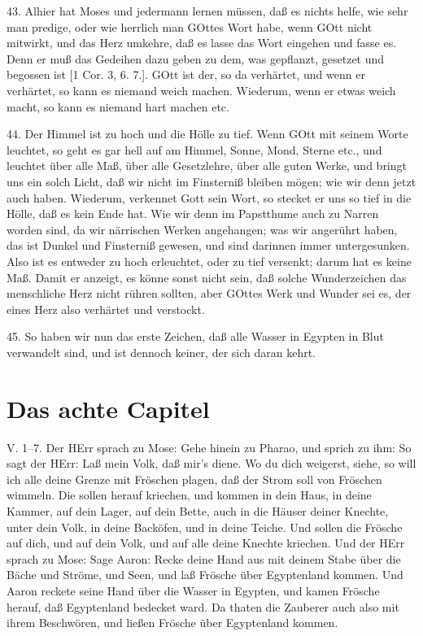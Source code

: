 43. Alhier hat Moses und jedermann lernen müssen, daß es nichts helfe, wie sehr man predige, oder wie herrlich man GOttes Wort habe, wenn GOtt nicht mitwirkt, und das Herz umkehre, daß es lasse das Wort eingehen und fasse es. Denn er muß das Gedeihen dazu geben zu dem, was gepflanzt, gesetzet und begossen ist [1 Cor. 3, 6. 7.]. GOtt ist der, so da verhärtet, und wenn er verhärtet, so kann es niemand weich machen. Wiederum, wenn er etwas weich macht, so kann es niemand hart machen etc.

44. Der Himmel ist zu hoch und die Hölle zu tief. Wenn GOtt mit seinem Worte leuchtet, so geht es gar hell auf am Himmel, Sonne, Mond, Sterne etc., und leuchtet über alle Maß, über alle Gesetzlehre, über alle guten Werke, und bringt uns ein solch Licht, daß wir nicht im Finsterniß bleiben mögen; wie wir denn jetzt auch haben. Wiederum, verkennet Gott sein Wort, so stecket er uns so tief in die Hölle, daß es kein Ende hat. Wie wir denn im Papstthume auch zu Narren worden sind, da wir närrischen Werken angehangen; was wir angerührt haben, das ist Dunkel und Finsterniß gewesen, und sind darinnen immer untergesunken. Also ist es entweder zu hoch erleuchtet, oder zu tief versenkt; darum hat es keine Maß. Damit er anzeigt, es könne sonst nicht sein, daß solche Wunderzeichen das menschliche Herz nicht rühren sollten, aber GOttes Werk und Wunder sei es, der eines Herz also verhärtet und verstockt.

45. So haben wir nun das erste Zeichen, daß alle Wasser in Egypten in Blut verwandelt sind, und ist dennoch keiner, der sich daran kehrt.

\section{Das achte Capitel}

\begin{schriftzitat}
V. 1–7. Der HErr sprach zu Mose: Gehe hinein zu Pharao, und sprich zu ihm: So sagt der HErr: Laß mein Volk, daß mir’s diene. Wo du dich weigerst, siehe, so will ich alle deine Grenze mit Fröschen plagen, daß der Strom soll von Fröschen wimmeln. Die sollen herauf kriechen, und kommen in dein Haus, in deine Kammer, auf dein Lager, auf dein Bette, auch in die Häuser deiner Knechte, unter dein Volk, in deine Backöfen, und in deine Teiche. Und sollen die Frösche auf dich, und auf dein Volk, und auf alle deine Knechte kriechen. Und der HErr sprach zu Mose: Sage Aaron: Recke deine Hand aus mit deinem Stabe über die Bäche und Ströme, und Seen, und laß Frösche über Egyptenland kommen. Und Aaron reckete seine Hand über die Wasser in Egypten, und kamen Frösche herauf, daß Egyptenland bedecket ward. Da thaten die Zauberer auch also mit ihrem Beschwören, und ließen Frösche über Egyptenland kommen.
\end{schriftzitat}

